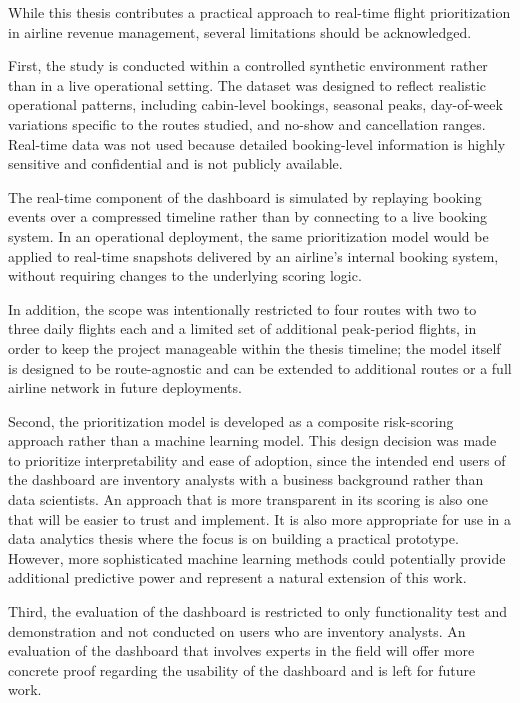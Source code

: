 While this thesis contributes a practical approach to real-time flight prioritization in airline revenue management, several limitations should be acknowledged.

First, the study is conducted within a controlled synthetic environment rather than in a live operational setting. The dataset was designed to reflect realistic operational patterns, including cabin-level bookings, seasonal peaks, day-of-week variations specific to the routes studied, and no-show and cancellation ranges. Real-time data was not used because detailed booking-level information is highly sensitive and confidential and is not publicly available.

The real-time component of the dashboard is simulated by replaying booking events over a compressed timeline rather than by connecting to a live booking system. In an operational deployment, the same prioritization model would be applied to real-time snapshots delivered by an airline's internal booking system, without requiring changes to the underlying scoring logic.

In addition, the scope was intentionally restricted to four routes with two to three daily flights each and a limited set of additional peak-period flights, in order to keep the project manageable within the thesis timeline; the model itself is designed to be route-agnostic and can be extended to additional routes or a full airline network in future deployments.

Second, the prioritization model is developed as a composite risk-scoring approach rather than a machine learning model. This design decision was made to prioritize interpretability and ease of adoption, since the intended end users of the dashboard are inventory analysts with a business background rather than data scientists. An approach that is more transparent in its scoring is also one that will be easier to trust and implement. It is also more appropriate for use in a data analytics thesis where the focus is on building a practical prototype. However, more sophisticated machine learning methods could potentially provide additional predictive power and represent a natural extension of this work.

Third, the evaluation of the dashboard is restricted to only functionality test and demonstration and not conducted on users who are inventory analysts. An evaluation of the dashboard that involves experts in the field will offer more concrete proof regarding the usability of the dashboard and is left for future work.

